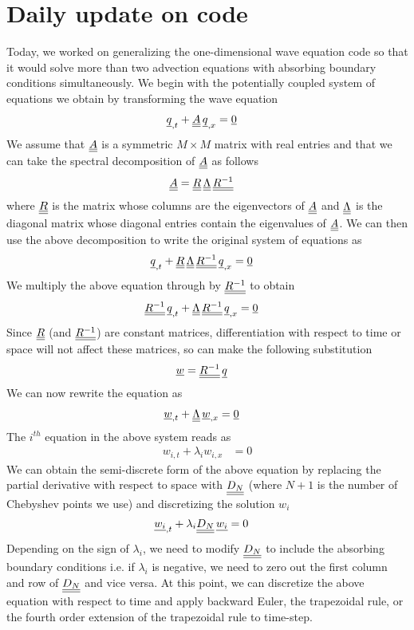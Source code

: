 

\section*{Daily update on code}
Today, we worked on generalizing the one-dimensional wave equation code so that it would solve more than two advection equations with absorbing boundary conditions simultaneously.
We begin with the potentially coupled system of equations we obtain by transforming the wave equation
\begin{align}
	{\underline{q}}_{, t} + {\underline{\underline{A}}} \, {\underline{q}}_{, x} & = {\underline{0}}
\end{align}
We assume that ${\underline{\underline{A}}}$ is a symmetric $M \times M$ matrix with real entries and that we can take the spectral decomposition of ${\underline{\underline{A}}}$ as follows
\begin{align}
	{\underline{\underline{A}}} & = {\underline{\underline{R}}} \, {\underline{\underline{\Lambda}}} \, {\underline{\underline{R^{-1}}}}
\end{align}
where ${\underline{\underline{R}}}$ is the matrix whose columns are the eigenvectors of ${\underline{\underline{A}}}$ and ${\underline{\underline{\Lambda}}}$ is the diagonal matrix whose diagonal entries contain the eigenvalues of ${\underline{\underline{A}}}$.
We can then use the above decomposition to write the original system of equations as
\begin{align}
	{\underline{q}}_{, t} + {\underline{\underline{R}}} \, {\underline{\underline{\Lambda}}} \, {\underline{\underline{R^{-1}}}} \, {\underline{q}}_{, x} & = {\underline{0}}
\end{align}
We multiply the above equation through by ${\underline{\underline{R^{-1}}}}$ to obtain
\begin{align}
	{\underline{\underline{R^{-1}}}} \, {\underline{q}}_{, t} + {\underline{\underline{\Lambda}}} \, {\underline{\underline{R^{-1}}}} \, {\underline{q}}_{, x} & = {\underline{0}}
\end{align}
Since ${\underline{\underline{R}}}$ (and ${\underline{\underline{R^{-1}}}}$) are constant matrices, differentiation with respect to time or space will not affect these matrices, so can make the following substitution
\begin{align}
	{\underline{w}} & = {\underline{\underline{R^{-1}}}} \, {\underline{q}}
\end{align}
We can now rewrite the equation as
\begin{align} 
	{\underline{w}}_{, t} + {\underline{\underline{\Lambda}}} \, {\underline{w}}_{, x} & = {\underline{0}}
\end{align}
The $i^{th}$ equation in the above system reads as 
\begin{align}
	w_{i, t} + \lambda_{i} w_{i, x} & = 0
\end{align}
We can obtain the semi-discrete form of the above equation by replacing the partial derivative with respect to space with ${\underline{\underline{D_{N}}}}$ (where $N + 1$ is the number of Chebyshev points we use) and discretizing the solution $w_{i}$
\begin{align}
	{\underline{w_{i}}}_{, t} + \lambda_{i} {\underline{\underline{D_{N}}}} \, {\underline{w_{i}}} & = 0
\end{align}
Depending on the sign of $\lambda_{i}$, we need to modify ${\underline{\underline{D_{N}}}}$ to include the absorbing boundary conditions i.e. if $\lambda_{i}$ is negative, we need to zero out the first column and row of ${\underline{\underline{D_{N}}}}$ and vice versa. 
At this point, we can discretize the above equation with respect to time and apply backward Euler, the trapezoidal rule, or the fourth order extension of the trapezoidal rule to time-step.